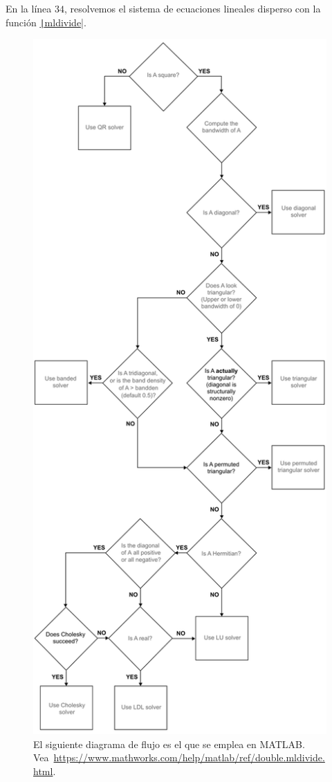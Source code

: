 \begin{problem}
En la línea $34$, resolvemos el sistema de ecuaciones lineales
disperso con la función \href{https://docs.octave.org/latest/Arithmetic-Ops.html#index-mldivide}{\texttt|mldivide|}.

\begin{figure}[ht!]
    \centering
    \includegraphics[width=.2\paperwidth]{mldivide_sparse}
    \caption{El siguiente diagrama de flujo es el que se emplea en MATLAB.
        Vea~\url{https://www.mathworks.com/help/matlab/ref/double.mldivide.html}.}
\end{figure}


\end{problem}
